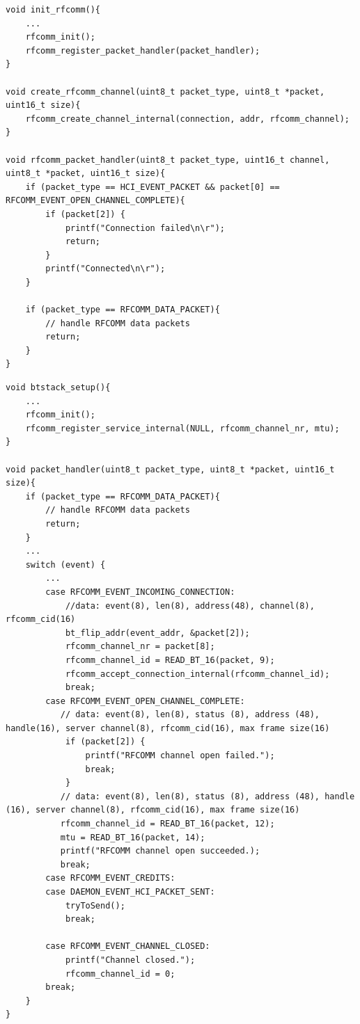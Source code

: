 \begin{lstlisting}[float, caption=RFCOMM handler for outgoing RFCOMM channel., label=RFCOMMremoteService] 
void init_rfcomm(){
    ...
    rfcomm_init();
    rfcomm_register_packet_handler(packet_handler);
}

void create_rfcomm_channel(uint8_t packet_type, uint8_t *packet, uint16_t size){
    rfcomm_create_channel_internal(connection, addr, rfcomm_channel);
}

void rfcomm_packet_handler(uint8_t packet_type, uint16_t channel, uint8_t *packet, uint16_t size){
    if (packet_type == HCI_EVENT_PACKET && packet[0] == RFCOMM_EVENT_OPEN_CHANNEL_COMPLETE){
        if (packet[2]) {
            printf("Connection failed\n\r");
            return;
        }
        printf("Connected\n\r");
    }
    
    if (packet_type == RFCOMM_DATA_PACKET){
        // handle RFCOMM data packets
        return;
    }
}
\end{lstlisting}

\begin{lstlisting}[float, caption=Providing RFCOMM service., label=RFCOMMService]
void btstack_setup(){
    ...
    rfcomm_init();
    rfcomm_register_service_internal(NULL, rfcomm_channel_nr, mtu); 
}

void packet_handler(uint8_t packet_type, uint8_t *packet, uint16_t size){
    if (packet_type == RFCOMM_DATA_PACKET){
        // handle RFCOMM data packets
        return;
    }
    ...
    switch (event) {
        ...
        case RFCOMM_EVENT_INCOMING_CONNECTION:
            //data: event(8), len(8), address(48), channel(8), rfcomm_cid(16)
            bt_flip_addr(event_addr, &packet[2]); 
            rfcomm_channel_nr = packet[8];
            rfcomm_channel_id = READ_BT_16(packet, 9);
            rfcomm_accept_connection_internal(rfcomm_channel_id);
            break;
        case RFCOMM_EVENT_OPEN_CHANNEL_COMPLETE:
           // data: event(8), len(8), status (8), address (48), handle(16), server channel(8), rfcomm_cid(16), max frame size(16)
            if (packet[2]) {
                printf("RFCOMM channel open failed.");
                break;
            } 
           // data: event(8), len(8), status (8), address (48), handle (16), server channel(8), rfcomm_cid(16), max frame size(16)
           rfcomm_channel_id = READ_BT_16(packet, 12);
           mtu = READ_BT_16(packet, 14);
           printf("RFCOMM channel open succeeded.);
           break;
        case RFCOMM_EVENT_CREDITS:
        case DAEMON_EVENT_HCI_PACKET_SENT:
            tryToSend();
            break;

        case RFCOMM_EVENT_CHANNEL_CLOSED:
            printf("Channel closed.");
            rfcomm_channel_id = 0;
        break;
    }
}
\end{lstlisting}


